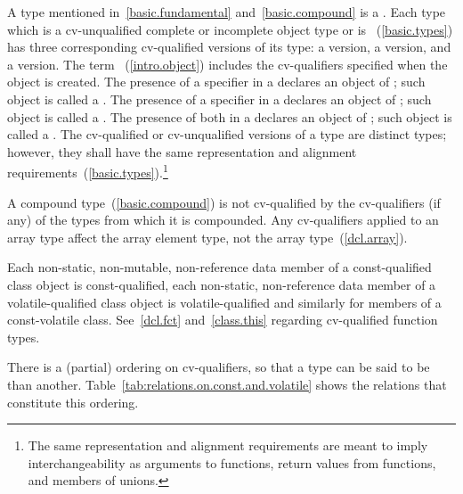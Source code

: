 \pnum
{}%
%
%
A type mentioned in~\ref{basic.fundamental} and~\ref{basic.compound} is
a . Each type which is a
cv-unqualified complete or incomplete object type or is
~(\ref{basic.types}) has three corresponding cv-qualified
versions of its type: a  version, a
 version, and a
 version. The term
~(\ref{intro.object}) includes the cv-qualifiers
specified when the object is created. The presence of a 
specifier in a  declares an object of
; such
object is called a . The presence of a
 specifier in a  declares
an object of  ; such object
is called a . The presence of both  in a
 declares an object of
;
such object is called a . The cv-qualified or
cv-unqualified versions of a type
are distinct types; however, they shall have the same representation and
alignment requirements~(\ref{basic.types}).\footnote{The same representation
and alignment requirements are meant to imply
interchangeability as arguments to functions, return values from
functions, and members of unions.}

\pnum
{}%
A compound type~(\ref{basic.compound}) is not cv-qualified by the
cv-qualifiers (if any) of the types from which it is compounded. Any
cv-qualifiers applied to an array type affect the array element type,
not the array type~(\ref{dcl.array}).

\pnum
{}%
Each non-static, non-mutable, non-reference data member of a
const-qualified class object is const-qual\-i\-fied, each non-static,
non-reference data member of a volatile-qualified class object is
volatile-qualified and similarly for members of a const-volatile class.
See~\ref{dcl.fct} and~\ref{class.this} regarding cv-qualified function
types.

\pnum
There is a (partial) ordering on cv-qualifiers, so that a type can be
said to be  than another.
Table~\ref{tab:relations.on.const.and.volatile} shows the relations that
constitute this ordering.

